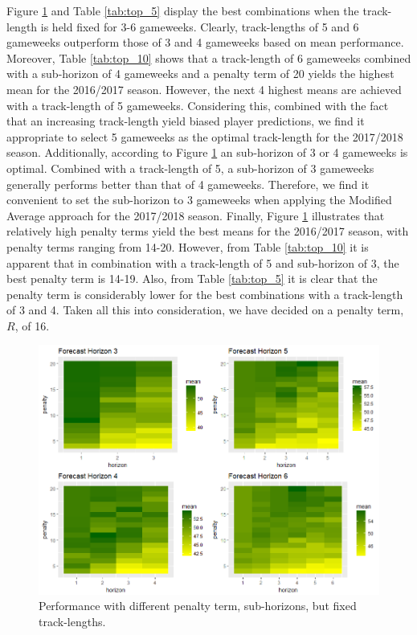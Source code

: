 Figure \ref{fig:fixed_f_hor} and Table \ref{tab:top_5} display the best combinations when the track-length is held fixed for 3-6 gameweeks. Clearly, track-lengths of 5 and 6 gameweeks outperform those of 3 and 4 gameweeks based on mean performance. Moreover, Table \ref{tab:top_10} shows that a track-length of 6 gameweeks combined with a sub-horizon of 4 gameweeks and a penalty term of 20 yields the highest mean for the 2016/2017 season. However, the next 4 highest means are achieved with a track-length of 5 gameweeks. Considering this, combined with the fact that an increasing track-length yield biased player predictions, we find it appropriate to select 5 gameweeks as the optimal track-length for the 2017/2018 season. Additionally, according to Figure \ref{fig:fixed_f_hor} an sub-horizon of 3 or 4 gameweeks is optimal. Combined with a track-length of 5, a sub-horizon of 3 gameweeks generally performs better than that of 4 gameweeks. Therefore, we find it convenient to set the sub-horizon to 3 gameweeks when applying the Modified Average approach for the 2017/2018 season. Finally, Figure \ref{fig:fixed_f_hor} illustrates that relatively high penalty terms yield the best means for the 2016/2017 season, with penalty terms ranging from 14-20. However, from Table \ref{tab:top_10} it is apparent that in combination with a track-length of 5 and sub-horizon of 3, the best penalty term is 14-19. Also, from Table \ref{tab:top_5} it is clear that the penalty term is considerably lower for the best combinations with a track-length of 3 and 4. Taken all this into consideration, we have decided on a penalty term, $R$, of 16.


\begin{figure}[H]
    \centering
    \includegraphics[scale=0.55]{fig/chapter_6/parameter_choice_fixed_f_hor.png}
    \caption{Performance with different penalty term, sub-horizons, but fixed track-lengths.}
\label{fig:fixed_f_hor}    
\end{figure}

